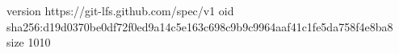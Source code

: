 version https://git-lfs.github.com/spec/v1
oid sha256:d19d0370be0df72f0ed9a14c5e163c698c9b9c9964aaf41c1fe5da758f4e8ba8
size 1010

